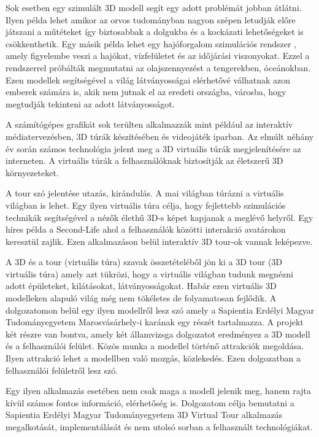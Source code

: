 Sok esetben egy szimulált 3D modell segít egy adott problémát jobban átlátni. Ilyen példa lehet amikor az orvos tudományban \cite{dedov2017design} nagyon szépen letudják előre játszani a műtéteket így biztosabbak a dolgukba és a kockázati lehetőségeket is csökkenthetik. Egy másik példa lehet egy hajóforgalom szimulációs rendszer \cite{dedov2017design}, amely figyelembe veszi a hajókat, vízfelületet és az időjárási viszonyokat. Ezzel a rendszerrel próbálták megmutatni az olajszennyezést \cite{dedov2017design} a tengerekben, óceánokban. Ezen modellek segítségével a világ látványosságai elérhetővé válhatnak azon emberek számára is, akik nem jutnak el az eredeti országba, városba, hogy megtudják tekinteni az adott látványosságot.

A számítógépes grafikát \cite{moloo20163d} sok terülten alkalmazzák mint például az interaktív médiatervezésben, 3D túrák készítésében és videojáték iparban. Az elmúlt néhány év során számos technológia jelent meg a 3D virtuális túrák megjelenítésére az interneten. A virtuális túrák a felhasználóknak biztosítják az életszerű 3D környezeteket.

A tour szó jelentése utazás, kirándulás. A mai világban túrázni a virtuális világban is lehet. Egy ilyen virtuális túra célja, hogy fejlettebb szimulációs technikák segítségével a nézők élethű 3D-s képet kapjanak a meglévő helyről. Egy híres példa a Second-Life \cite{moloo20163d} ahol a felhasználók közötti interakció avatárokon keresztül zajlik. Ezen alkalmazáson belül interaktív 3D tour-ok vannak leképezve.

A 3D és a tour (virtuális túra) szavak összetételéből jön ki a 3D tour (3D virtuális túra) amely azt tükrözi, hogy a virtuális világban tudunk megnézni adott épületeket, kilátásokat, látványosságokat. Habár ezen virtuális 3D modelleken alapuló világ még nem tökéletes de folyamatosan fejlődik. A dolgozatomon belül egy ilyen modellről lesz szó amely a Sapientia Erdélyi Magyar Tudományegyetem Marosvásárhely-i karának egy részét tartalmazza. A projekt két részre van bontva, amely két államvizsga dolgozatot eredményez a 3D modell és a felhasználói felület. Közös munka a modellel történő attrakciók megoldása. Ilyen attrakció lehet a modellben való mozgás, közlekedés. Ezen dolgozatban a felhasználói felületről lesz szó. 

Egy ilyen alkalmazás esetében nem csak maga a modell jelenik meg, hanem rajta kívül számos fontos információ, elérhetőség is. Dolgozatom célja bemutatni a Sapientia Erdélyi Magyar Tudományegyetem 3D Virtual Tour alkalmazás megalkotását, implementálását és nem utolsó sorban a felhasznált technológiákat.

